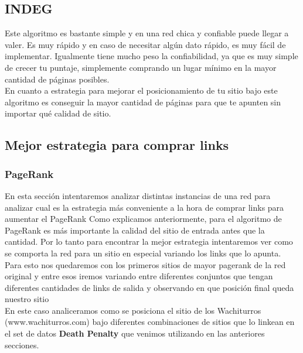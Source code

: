 \subsection{INDEG}
Este algoritmo es bastante simple y en una red chica y confiable puede llegar a valer. Es muy rápido y en caso de necesitar algún dato rápido, es muy fácil de implementar. Igualmente tiene mucho peso la confiabilidad, ya que es muy simple de crecer tu puntaje, simplemente comprando un lugar mínimo en la mayor cantidad de páginas posibles.\\
En cuanto a estrategia para mejorar el posicionamiento de tu sitio bajo este algoritmo es conseguir la mayor cantidad de páginas para que te apunten sin importar qué calidad de sitio.


\subsection{Mejor estrategia para comprar links}
\subsubsection{PageRank}

En esta sección intentaremos analizar distintas instancias de una red para analizar cual es la estrategia más conveniente a la hora de comprar links para aumentar el PageRank 
Como explicamos anteriormente, para el algoritmo de PageRank es más importante la calidad del sitio de entrada antes que la cantidad. Por lo tanto para encontrar la mejor estrategia intentaremos ver como se comporta la red para un sitio en especial variando los links que lo apunta. Para esto nos quedaremos con los primeros sitios de mayor pagerank de la red original y entre esos iremos variando entre diferentes conjuntos que tengan diferentes cantidades de links de salida y observando en que posición final queda nuestro sitio \\
En este caso analiceramos como se posiciona el sitio de los Wachiturros (www.wachiturros.com) bajo diferentes combinaciones de sitios que lo linkean en el set de datos \textbf{Death Penalty} que venimos utilizando en las anteriores secciones.\\

